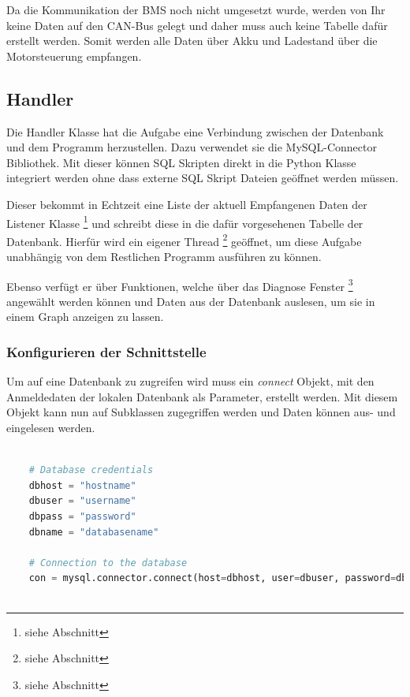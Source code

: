 Da die Kommunikation der BMS noch nicht umgesetzt wurde, werden von Ihr keine Daten auf den CAN-Bus gelegt und daher muss auch keine Tabelle dafür erstellt werden. Somit werden alle Daten über Akku und Ladestand über die Motorsteuerung empfangen.

\subsection{Handler}

Die Handler Klasse hat die Aufgabe eine Verbindung zwischen der Datenbank und dem Programm herzustellen. Dazu verwendet sie die MySQL-Connector Bibliothek. Mit dieser können SQL Skripten direkt in die Python Klasse integriert werden ohne dass externe SQL Skript Dateien geöffnet werden müssen.

Dieser bekommt in Echtzeit eine Liste der aktuell Empfangenen Daten der Listener Klasse \footnote{siehe Abschnitt } und schreibt diese in die dafür vorgesehenen Tabelle der Datenbank. Hierfür wird ein eigener Thread \footnote{siehe Abschnitt } geöffnet, um diese Aufgabe unabhängig von dem Restlichen Programm ausführen zu können.

Ebenso verfügt er über Funktionen, welche über das Diagnose Fenster \footnote{siehe Abschnitt } angewählt werden können und Daten aus der Datenbank auslesen, um sie in einem Graph anzeigen zu lassen.

\subsubsection{Konfigurieren der Schnittstelle}

Um auf eine Datenbank zu zugreifen wird muss ein \textit{connect} Objekt, mit den Anmeldedaten der lokalen Datenbank als Parameter, erstellt werden. Mit diesem Objekt kann nun auf Subklassen zugegriffen werden und Daten können aus- und eingelesen werden.

\begin{lstlisting}[language=Python, caption={Konfiguration der Datenbankschnittstelle},captionpos=b]
	
	# Database credentials
	dbhost = "hostname"
	dbuser = "username"
	dbpass = "password"
	dbname = "databasename"
	
	# Connection to the database
	con = mysql.connector.connect(host=dbhost, user=dbuser, password=dbpass, database=dbname)
	
\end{lstlisting}

